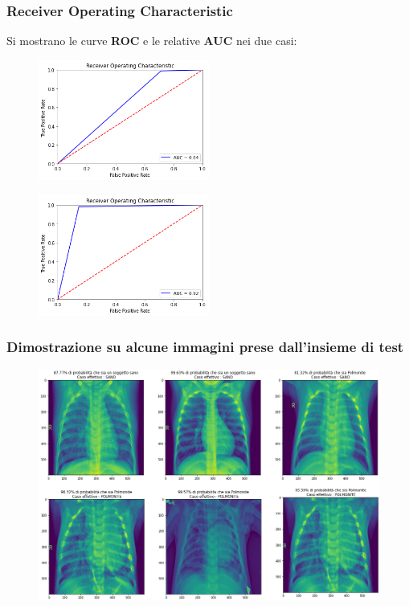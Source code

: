 \documentclass{beamer}
\begin{document}
\begin{frame}
	\frametitle{Receiver Operating Characteristic}
	Si mostrano le curve \textbf{ROC} e le relative \textbf{AUC} nei due casi:
	\begin{figure}
		\includegraphics[width=0.5\textwidth]{roc-pneumonia-no-aug.png}
	\end{figure}

\begin{figure}
	\includegraphics[width=0.5\textwidth]{roc-pneumonia-aug.png}
\end{figure}	
\end{frame}


\begin{frame}
	\frametitle{Dimostrazione su alcune immagini prese dall'insieme di test}
	
	\begin{figure}
		\includegraphics[width=1\textwidth]{pneumonia results.png}
	\end{figure}

\end{frame}
\end{document}
